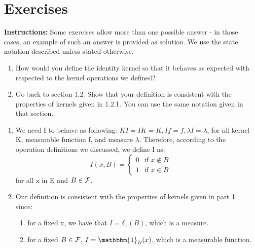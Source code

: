 

\section{Exercises}

\textbf{Instructions:} Some exercises allow more than one possible answer - in those cases, an example of such an answer is provided as solution. We use the state notation described unless stated otherwise. 

\begin{Exercise}
\begin{enumerate}[label=(\alph*)]
\item How would you define the identity kernel so that it behaves as expected with respected to the kernel operations we defined? 
\item Go back to section 1.2. Show that your definition is consistent with the properties of kernels given in 1.2.1. You can use the same notation given in that section.
\end{enumerate}
\end{Exercise}
\begin{Answer}
\begin{enumerate}[label=(\alph*)]
\item We need I to behave as following: $ KI = IK = K, If = f, \lambda I = \lambda $, for all kernel K, measurable function f, and measure $\lambda$. Therefore, according to the operation definitions we discussed, we define I as:
\begin{equation*}
I(x, B) = \begin{cases}
             0  & \text{if } x \not \in B \\
             1  & \text{if } x \in B
       \end{cases} \quad
\end{equation*} for all x in E and $B \in \mathcal{F}$.


\item Our definition is consistent with the properties of kernels given in part 1 since:
\begin{enumerate}[label=(\roman*)]
\item for a fixed x, we have that $I = \delta_x(B)$, which is a measure.
\item for a fixed $B \in \mathcal{F}$, $I = \mathbbm{1}_B(x)$, which is a measurable function.
\end{enumerate}
\end{enumerate}
\end{Answer}


